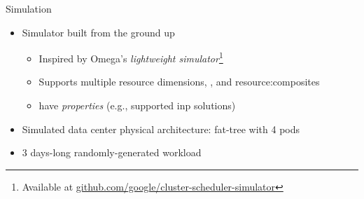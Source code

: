 \begin{frame}{Simulation}
    \begin{itemize}
        \item Simulator built from the ground up %
        \begin{itemize}
            \item Inspired by Omega's \cite{omega} \textit{lightweight simulator}\footnote[2]{\scriptsize{Available at \href{https://github.com/google/cluster-scheduler-simulator}{github.com/google/cluster-scheduler-simulator}}}
            \item Supports multiple resource dimensions, , and \glspl{resource:composite}
            \item {} have \textit{properties} (e.g., supported \gls{inp} solutions)
        \end{itemize}
        \item Simulated data center physical architecture: fat-tree with 4 pods
        \item 3 days-long randomly-generated workload
    \end{itemize}
\end{frame}

